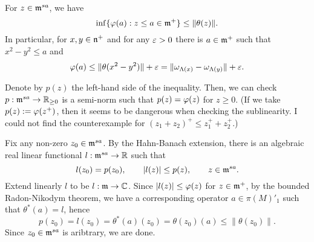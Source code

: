 \documentclass{../../../small}
\begin{document}
\begin{lem}
For $z\in\mathfrak{m}^{sa}$, we have
\[\inf\{\varphi(a):z\le a\in\mathfrak{m}^+\}\le\|\theta(z)\|.\]
In particular, for $x,y\in\mathfrak{n}^+$ and for any $\varepsilon>0$ there is $a\in\mathfrak{m}^+$ such that $x^2-y^2\le a$ and
\[\varphi(a)\le\|\theta(x^2-y^2)\|+\varepsilon=\|\omega_{\Lambda(x)}-\omega_{\Lambda(y)}\|+\varepsilon.\]
\end{lem}
\begin{pf}
Denote by $p(z)$ the left-hand side of the inequality.
Then, we can check $p:\mathfrak{m}^{sa}\to\mathbb{R}_{\ge0}$ is a semi-norm such that $p(z)=\varphi(z)$ for $z\ge0$.
(If we take $p(z):=\varphi(z^+)$, then it seems to be dangerous when checking the sublinearity. I could not find the counterexample for $(z_1+z_2)^+\le z_1^++z_2^+$.)

Fix any non-zero $z_0\in\mathfrak{m}^{sa}$.
By the Hahn-Banach extension, there is an algebraic real linear functional $l:\mathfrak{m}^{sa}\to\mathbb{R}$ such that
\[l(z_0)=p(z_0),\qquad |l(z)|\le p(z),\qquad z\in\mathfrak{m}^{sa}.\]
Extend linearly $l$ to be $l:\mathfrak{m}\to\mathbb{C}$.
Since $|l(z)|\le\varphi(z)$ for $z\in\mathfrak{m}^+$, by the bounded Radon-Nikodym theorem, we have a corresponding operator $a\in\pi(M)'_1$ such that $\theta^*(a)=l$, hence
\[p(z_0)=l(z_0)=\theta^*(a)(z_0)=\theta(z_0)(a)\le\|\theta(z_0)\|.\]
Since $z_0\in\mathfrak{m}^{sa}$ is aribtrary, we are done.
\end{pf}
\end{document}
